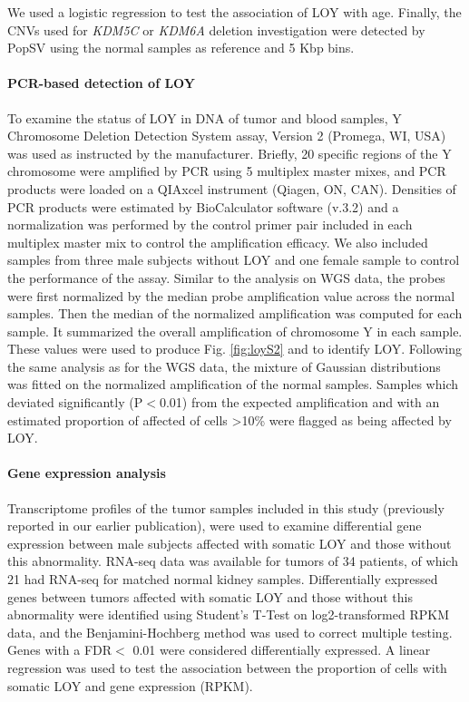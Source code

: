 We used a logistic regression to test the association of LOY with age.
Finally, the CNVs used for {\it KDM5C} or {\it KDM6A} deletion investigation were detected by {\sf PopSV}\cite{Monlong034165} using the normal samples as reference and 5 Kbp bins.

\paragraph{PCR-based detection of LOY}

To examine the status of LOY in DNA of tumor and blood samples, Y Chromosome Deletion Detection System assay, Version 2 (Promega, WI, USA) was used as instructed by the manufacturer.
Briefly, 20 specific regions of the Y chromosome were amplified by PCR using 5 multiplex master mixes, and PCR products were loaded on a QIAxcel instrument (Qiagen, ON, CAN).
Densities of PCR products were estimated by BioCalculator software (v.3.2) and a normalization was performed by the control primer pair included in each multiplex master mix to control the amplification efficacy.
We also included samples from three male subjects without LOY and one female sample to control the performance of the assay.
Similar to the analysis on WGS data, the probes were first normalized by the median probe amplification value across the normal samples.
Then the median of the normalized amplification was computed for each sample.
It summarized the overall amplification of chromosome Y in each sample.
These values were used to produce Fig. \ref{fig:loyS2} and to identify LOY.
Following the same analysis as for the WGS data, the mixture of Gaussian distributions was fitted on the normalized amplification of the normal samples.
Samples which deviated significantly (P$<$0.01) from the expected amplification and with an estimated proportion of affected of cells \textgreater{}10\% were flagged as being affected by LOY.

\paragraph{Gene expression analysis}

Transcriptome profiles of the tumor samples included in this study (previously reported in our earlier publication\cite{Scelo2014}), were used to examine differential gene expression between male subjects affected with somatic LOY and those without this abnormality.
RNA-seq data was available for tumors of 34 patients, of which 21 had RNA-seq for matched normal kidney samples.
Differentially expressed genes between tumors affected with somatic LOY and those without this abnormality were identified using Student's T-Test on log2-transformed RPKM data, and the Benjamini-Hochberg method was used to correct multiple testing.
Genes with a FDR$<$ 0.01 were considered differentially expressed.
A linear regression was used to test the association between the proportion of cells with somatic LOY and gene expression (RPKM).


